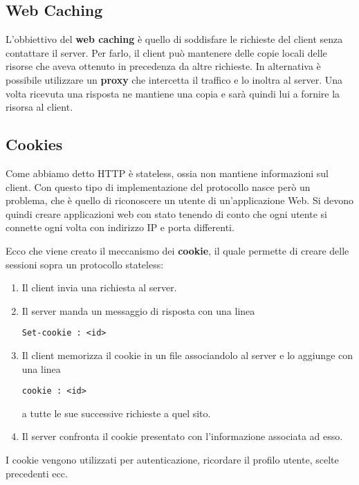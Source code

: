 \subsection{Web Caching}
L'obbiettivo del \textbf{web caching} è quello di soddisfare le richieste del client senza
contattare il server. Per farlo, il client può mantenere delle copie locali delle risorse che aveva
ottenuto in precedenza da altre richieste.
In alternativa è possibile utilizzare un \textbf{proxy} che intercetta il traffico e lo inoltra al 
server. Una volta ricevuta una risposta ne mantiene una copia e sarà quindi lui a fornire la
risorsa al client.

\subsection{Cookies}
Come abbiamo detto HTTP è stateless, ossia non mantiene informazioni sul client. Con questo tipo
di implementazione del protocollo nasce però un problema, che è quello di riconoscere un utente
di un'applicazione Web. Si devono quindi creare applicazioni web con stato tenendo di conto che 
ogni utente si connette ogni volta con indirizzo IP e porta differenti.

Ecco che viene creato il meccanismo dei \textbf{cookie}, il quale permette di creare delle sessioni
sopra un protocollo stateless:
\begin{enumerate}
	\item Il client invia una richiesta al server.
	\item Il server manda un messaggio di risposta con una linea
		\begin{center} \verb|Set-cookie : <id>| \end{center}
	\item Il client memorizza il cookie in un file associandolo al server e lo aggiunge con una 
		linea
		\begin{center} \verb|cookie : <id>| \end{center}
		a tutte le sue successive richieste a quel sito.
	\item Il server confronta il cookie presentato con l'informazione associata ad esso.
\end{enumerate}
I cookie vengono utilizzati per autenticazione, ricordare il profilo utente, scelte precedenti ecc.
